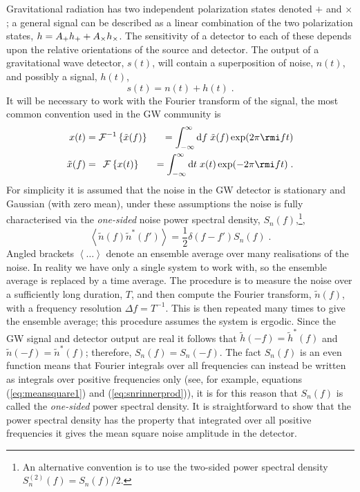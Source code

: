 Gravitational radiation has two independent polarization states denoted $+$ and $\times$; a general signal can be described as a linear combination of the two polarization states, $h \nobreak=\nobreak A_{+} h_{+}\nobreak +\nobreak A_{\times} h_{\times}$. The sensitivity of a detector to each of these depends upon the relative orientations of the source and detector. The output of a gravitational wave detector, $s(t)$, will contain a superposition of noise, $n(t)$, and possibly a signal, $h(t)$,
\begin{equation} s(t)=n(t)+h(t) \; . \end{equation}
It will be necessary to work with the Fourier transform of the signal, the most common convention used in the GW community is
\begin{eqnarray} x(t)&={\cal{F}}^{-1}\left\{\tilde{x}(f)\right\}&=\int_{-\infty}^{\infty}\mathrm{d}f\;\tilde{x}(f)\exp (2\pi \rmi f t )  \nonumber \\
\tilde{x}(f) &=\,\;{\cal{F}}\left\{x(t)\right\}&=\int_{-\infty}^{\infty}\mathrm{d}t\;x(t)\exp (-2\pi \rmi f t )\; .\end{eqnarray}
For simplicity it is assumed that the noise in the GW detector is stationary and Gaussian (with zero mean), under these assumptions the noise is fully characterised via the \emph{one-sided} noise power spectral density, $S_{n}(f)$,\footnote{An alternative convention is to use the two-sided power spectral density $S^{(2)}_{n}(f)=S_{n}(f)/2$.}, 
\begin{equation}\label{eq:psd} \left<\tilde{n}(f)\tilde{n}^{*}(f')\right>=\frac{1}{2}\delta (f-f')S_{n}(f) \; .\end{equation}
Angled brackets $\left<\ldots\right>$ denote an ensemble average over many realisations of the noise. In reality we have only a single system to work with, so the ensemble average is replaced by a time average. The procedure is to measure the noise over a sufficiently long duration, $T$, and then compute the Fourier transform, $\tilde{n}(f)$, with a frequency resolution $\Delta f = T^{-1}$. This is then repeated many times to give the ensemble average; this procedure assumes the system is ergodic. Since the GW signal and detector output are real it follows that $\tilde{h}(-f)=\tilde{h}^{*}(f)$ and $\tilde{n}(-f)=\tilde{n}^{*}(f)$; therefore, $S_{n}(f)=S_{n}(-f)$. The fact $S_{n}(f)$ is an even function means that Fourier integrals over all frequencies can instead be written as integrals over positive frequencies only (see, for example, equations (\ref{eq:meansquare1}) and (\ref{eq:snrinnerprod})), it is for this reason that $S_{n}(f)$ is called the \emph{one-sided} power spectral density. It is straightforward to show that the power spectral density has the property that integrated over all positive frequencies it gives the mean square noise amplitude in the detector.
